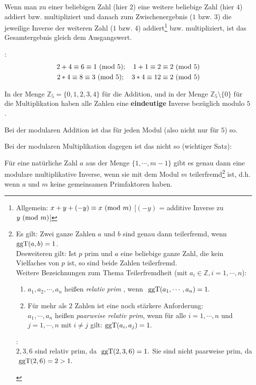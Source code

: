 \begin{refsegment}
Wenn man zu einer beliebigen Zahl (hier $2$) eine weitere beliebige Zahl (hier $4$) addiert bzw.
multipliziert und danach zum Zwischenergebnis ($1$ bzw. $3$)
die jeweilige Inverse der weiteren Zahl ($1$ bzw. $4$)
addiert\footnote{%
Allgemein: $x + y + (-y) \equiv x{\rm ~(mod~}m)$ [$(-y)$ = additive Inverse zu $y{\rm ~(mod~}m)$]
} bzw. multipliziert,
ist das Gesamtergebnis gleich dem Ausgangswert.

\begin{example}{:}
\begin{eqnarray*}
2 + 4 \equiv 6 \equiv 1 {\rm ~(mod~ } 5) ; \quad 1 + 1 \equiv 2 \equiv 2 {\rm ~(mod~ } 5)  \nonumber\\
2 * 4 \equiv 8 \equiv 3 {\rm ~(mod~ } 5) ; \quad 3 * 4 \equiv 12 \equiv 2 {\rm ~(mod~ } 5) \nonumber
\end{eqnarray*}
\end{example}


In der Menge $\mathbb{Z}_5 = \{0, 1, 2, 3, 4\}$ für die Addition, und in der
Menge $\mathbb{Z}_5 \setminus \{ 0\}$  für die Multiplikation haben alle Zahlen
eine {\bf eindeutige} Inverse bezüglich modulo $5$.

Bei der modularen Addition ist das für jeden Modul (also nicht nur für $5$)
so.

Bei der modularen Multiplikation dagegen ist das nicht so (wichtiger Satz):
\begin{satz}\label{thm-zth-multinv}
Für eine natürliche Zahl $a$ aus der Menge $\{1, \cdots, m-1\}$ gibt es genau
dann eine modulare multiplikative Inverse, wenn sie mit dem Modul
$m$ teilerfremd\footnote{%
  Es gilt: Zwei ganze Zahlen $a$ und $b$ sind genau dann teilerfremd, wenn ${\rm ggT}(a, b) = 1$.\\
  Desweiteren gilt: Ist $p$ prim und $a$ eine beliebige ganze Zahl, die kein
  Vielfaches von $p$ ist, so sind beide Zahlen teilerfremd.\\
  Weitere Bezeichnungen zum Thema Teilerfremdheit (mit $a_i \in \mathbb{Z},
  i=1, \cdots, n$):
  \begin{enumerate}
  \item $a_1,a_2, \cdots, a_n$ heißen {\em relativ prim}
    ,
    wenn $ {\rm~ggT}(a_1, \cdots , a_n) =1.$
  \item Für mehr als $2$ Zahlen  ist eine noch stärkere Anforderung:\\
    $a_1, \cdots , a_n$ heißen {\em paarweise relativ prim}, wenn für alle
    $i=1, \cdots, n$ und $j=1, \cdots , n$ mit $ i \neq j $ gilt:
    $ {\rm ggT} (a_i, a_j) =1. $
  \end{enumerate}
  \begin{example}{:}\\
  $2,3,6 $ sind relativ prim, da $ {\rm~ggT} (2,3,6)=1.$
  Sie sind nicht paarweise prim, da $ {\rm~ggT} (2,6)=2>1.$
  \end{example}
} ist, d.h. wenn $a$ und $m$ keine gemeinsamen Primfaktoren haben.
\end{satz}


\end{refsegment}
